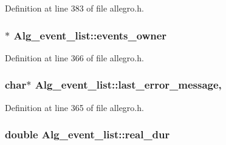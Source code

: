 Definition at line 383 of file allegro.\+h.

\subsubsection[{\texorpdfstring{events\+\_\+owner}{events_owner}}]{$\ast$ Alg\+\_\+event\+\_\+list\+::events\+\_\+owner\hspace{0.3cm}{\ttfamily [protected]}}\hypertarget{class_alg__event__list_a3aa639ce336e0f192730bb0d6cc52aef}{}\label{class_alg__event__list_a3aa639ce336e0f192730bb0d6cc52aef}


Definition at line 366 of file allegro.\+h.

\subsubsection[{\texorpdfstring{last\+\_\+error\+\_\+message}{last_error_message}}]{ char$\ast$ Alg\+\_\+event\+\_\+list\+::last\+\_\+error\+\_\+message\hspace{0.3cm}{\ttfamily [static]}, {\ttfamily [protected]}}\hypertarget{class_alg__event__list_a1539cf3d6dd2b752986c748a5b8c4dd2}{}\label{class_alg__event__list_a1539cf3d6dd2b752986c748a5b8c4dd2}


Definition at line 365 of file allegro.\+h.

\subsubsection[{\texorpdfstring{real\+\_\+dur}{real_dur}}]{\setlength{\rightskip}{0pt plus 5cm}double Alg\+\_\+event\+\_\+list\+::real\+\_\+dur\hspace{0.3cm}{\ttfamily [protected]}}\hypertarget{class_alg__event__list_af6a2f1a4d814d60dcc8c2abf17b79b53}{}\label{class_alg__event__list_af6a2f1a4d814d60dcc8c2abf17b79b53}


